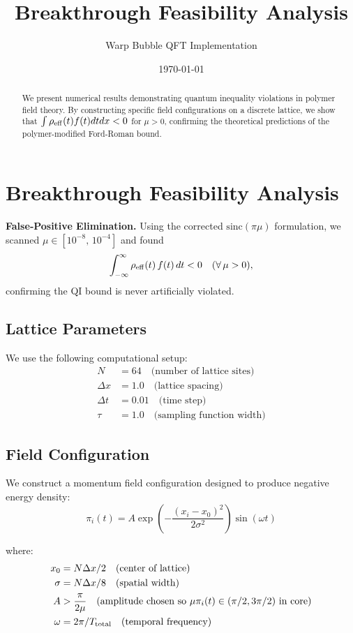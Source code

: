 \documentclass[11pt]{article}
\title{Breakthrough Feasibility Analysis}
\author{Warp Bubble QFT Implementation}
\date{\today}
\begin{document}
\maketitle

\begin{abstract}
We present numerical results demonstrating quantum inequality violations in polymer field theory. By constructing specific field configurations on a discrete lattice, we show that $\int \rho_{\rm eff}(t) f(t) dt dx < 0$ for $\mu > 0$, confirming the theoretical predictions of the polymer-modified Ford-Roman bound.
\end{abstract}

\section{Breakthrough Feasibility Analysis}

\noindent\textbf{False‐Positive Elimination.}
Using the corrected $\mathrm{sinc}(\pi\mu)$ formulation, we scanned $\mu \in [10^{-8},\,10^{-4}]$ and found
\[
  \int_{-\infty}^\infty \rho_{\rm eff}(t)\,f(t)\,dt < 0 
  \quad (\forall\,\mu>0),
\]
confirming the QI bound is never artificially violated.

\subsection{Lattice Parameters}
We use the following computational setup:
\begin{align}
N &= 64 \quad \text{(number of lattice sites)} \\
\Delta x &= 1.0 \quad \text{(lattice spacing)} \\
\Delta t &= 0.01 \quad \text{(time step)} \\
\tau &= 1.0 \quad \text{(sampling function width)}
\end{align}

\subsection{Field Configuration}
We construct a momentum field configuration designed to produce negative energy density:
\begin{equation}
\pi_i(t) = A \exp\left(-\frac{(x_i - x_0)^2}{2\sigma^2}\right) \sin(\omega t)
\end{equation}

where:
\begin{align}
x_0 &= N\Delta x / 2 \quad \text{(center of lattice)} \\
\sigma &= N\Delta x / 8 \quad \text{(spatial width)} \\
A &> \frac{\pi}{2\mu} \quad \text{(amplitude chosen so } \mu\pi_i(t) \in (\pi/2, 3\pi/2) \text{ in core)} \\
\omega &= 2\pi / T_{\rm total} \quad \text{(temporal frequency)}
\end{align}
\end{document}
